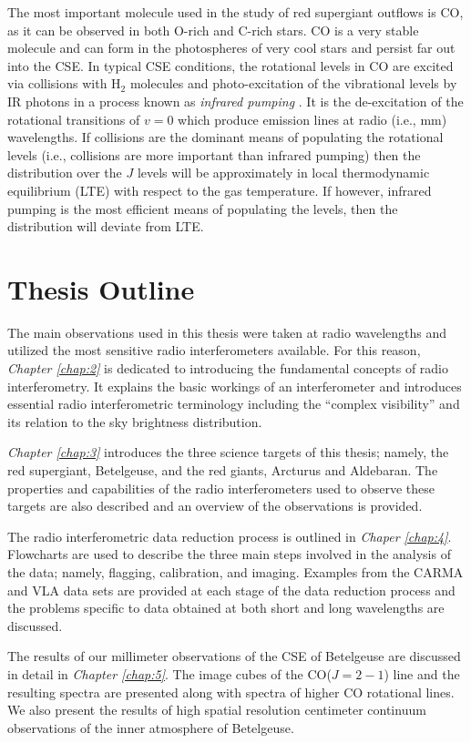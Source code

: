 The most important molecule used in the study of red supergiant outflows is CO, as it can be observed in both O-rich and C-rich stars. CO is a very stable molecule and can form in the photospheres of very cool stars and persist far out into the CSE. In typical CSE conditions, the rotational levels in CO are excited via collisions with H$_{2}$ molecules and photo-excitation of the vibrational levels by IR photons in a process known as \textit{infrared pumping} \citep{lamers_1999}. It is the de-excitation of the rotational transitions of $v=0$ which produce emission lines at radio (i.e., mm) wavelengths. If collisions are the dominant means of populating the rotational levels (i.e., collisions are more important than infrared pumping) then the distribution over the $J$ levels will be approximately in local thermodynamic equilibrium (LTE) with respect to the gas temperature. If however, infrared pumping is the most efficient means of populating the levels, then the distribution will deviate from LTE. 

\section{Thesis Outline}
The main observations used in this thesis were taken at radio wavelengths and utilized the most sensitive radio interferometers available. For this reason, \textit{Chapter \ref{chap:2}} is dedicated to introducing the fundamental concepts of radio interferometry. It explains the basic workings of an interferometer and introduces essential radio interferometric  terminology including the ``complex visibility'' and its relation to the sky brightness distribution.

\textit{Chapter \ref{chap:3}} introduces the three science targets of this thesis; namely, the red supergiant, Betelgeuse, and the red giants, Arcturus and Aldebaran. The properties and capabilities of the radio interferometers used to observe these targets are also described and an overview of the observations is provided.

The radio interferometric data reduction process is outlined in \textit{Chaper \ref{chap:4}}. Flowcharts are used to describe the three main steps involved in the analysis of the data; namely, flagging, calibration, and imaging. Examples from the CARMA and VLA data sets are provided at each stage of the data reduction process and the problems specific to data obtained at both short and long wavelengths are discussed. 

The results of our millimeter observations of the CSE of Betelgeuse are discussed in detail in \textit{Chapter \ref{chap:5}}. The image cubes of the CO($J=2-1$) line and the resulting spectra are presented along with spectra of higher CO rotational lines. We also present the results of high spatial resolution centimeter continuum observations of the inner atmosphere of Betelgeuse.

